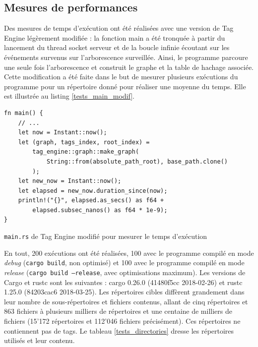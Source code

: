 \subsection{Mesures de performances}
Des mesures de temps d'exécution ont été réalisées avec une version de Tag Engine légèrement modifiée :
la fonction main a été tronquée à partir du lancement du thread socket serveur et de la boucle infinie 
écoutant sur les événements survenus sur l'arborescence surveillée. Ainsi, le programme parcoure 
une seule fois l'arborescence et construit le graphe et la table de hachage associée. Cette modification 
a été faite dans le but de mesurer plusieurs exécutions du programme pour un répertoire donné pour 
réaliser une moyenne du temps. Elle est illustrée au listing \ref{tests_main_modif}. 
\bigbreak
\begin{code}
    \begin{verbatim}
fn main() {
    // ...
    let now = Instant::now();
    let (graph, tags_index, root_index) = 
        tag_engine::graph::make_graph(
            String::from(absolute_path_root), base_path.clone()
        );
    let new_now = Instant::now();
    let elapsed = new_now.duration_since(now);
    println!("{}", elapsed.as_secs() as f64 + 
        elapsed.subsec_nanos() as f64 * 1e-9);
}
    \end{verbatim}
    \caption{\texttt{main.rs} de Tag Engine modifié pour mesurer le temps d'exécution}
    \label{tests_main_modif}
\end{code}
\bigbreak
En tout, 200 exécutions ont été réalisées, 100 avec le programme compilé 
en mode \textit{debug} (\texttt{cargo build}, non optimisé) et 100 avec le programme 
compilé en mode \textit{release} (\texttt{cargo build --release}, avec optimisations maximum).
Les versions de Cargo et rustc sont les suivantes : cargo 0.26.0 (41480f5cc 2018-02-26) et rustc 1.25.0 (84203cac6 2018-03-25).
Les répertoires cibles diffèrent grandement dans leur nombre de sous-répertoires et fichiers contenus, allant 
de cinq répertoires et 863 fichiers à plusieurs milliers de répertoires et une centaine de milliers 
de fichiers (15'172 répertoires et 112'046 fichiers précisément). Ces répertoires ne contiennent 
pas de tags. Le tableau \ref{tests_directories} dresse les répertoires utilisés et leur contenu.
